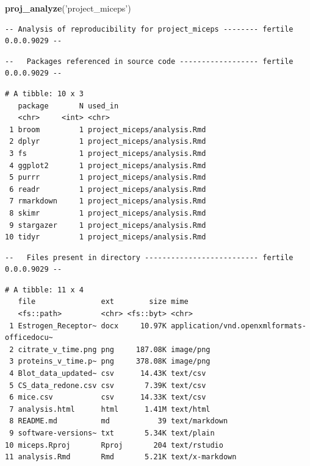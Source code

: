 \documentclass[12pt,twoside]{reedthesis}
\newenvironment{Shaded}{\begin{snugshade}}{\end{snugshade}}
\newcommand{\KeywordTok}[1]{\textcolor[rgb]{0.13,0.29,0.53}{\textbf{#1}}}
\newcommand{\StringTok}[1]{\textcolor[rgb]{0.31,0.60,0.02}{#1}}
\newcommand{\NormalTok}[1]{#1}
\begin{document}
\begin{Shaded}
\begin{Highlighting}[]
\KeywordTok{proj_analyze}\NormalTok{(}\StringTok{'project_miceps'}\NormalTok{)}
\end{Highlighting}
\end{Shaded}
\begin{verbatim}
-- Analysis of reproducibility for project_miceps -------- fertile 0.0.0.9029 --
\end{verbatim}
\begin{verbatim}
--   Packages referenced in source code ------------------ fertile 0.0.0.9029 --
\end{verbatim}
\begin{verbatim}
# A tibble: 10 x 3
   package       N used_in                    
   <chr>     <int> <chr>                      
 1 broom         1 project_miceps/analysis.Rmd
 2 dplyr         1 project_miceps/analysis.Rmd
 3 fs            1 project_miceps/analysis.Rmd
 4 ggplot2       1 project_miceps/analysis.Rmd
 5 purrr         1 project_miceps/analysis.Rmd
 6 readr         1 project_miceps/analysis.Rmd
 7 rmarkdown     1 project_miceps/analysis.Rmd
 8 skimr         1 project_miceps/analysis.Rmd
 9 stargazer     1 project_miceps/analysis.Rmd
10 tidyr         1 project_miceps/analysis.Rmd
\end{verbatim}
\begin{verbatim}
--   Files present in directory -------------------------- fertile 0.0.0.9029 --
\end{verbatim}
\begin{verbatim}
# A tibble: 11 x 4
   file               ext        size mime                                      
   <fs::path>         <chr> <fs::byt> <chr>                                     
 1 Estrogen_Receptor~ docx     10.97K application/vnd.openxmlformats-officedocu~
 2 citrate_v_time.png png     187.08K image/png                                 
 3 proteins_v_time.p~ png     378.08K image/png                                 
 4 Blot_data_updated~ csv      14.43K text/csv                                  
 5 CS_data_redone.csv csv       7.39K text/csv                                  
 6 mice.csv           csv      14.33K text/csv                                  
 7 analysis.html      html      1.41M text/html                                 
 8 README.md          md           39 text/markdown                             
 9 software-versions~ txt       5.34K text/plain                                
10 miceps.Rproj       Rproj       204 text/rstudio                              
11 analysis.Rmd       Rmd       5.21K text/x-markdown                           
\end{verbatim}
\end{document}
